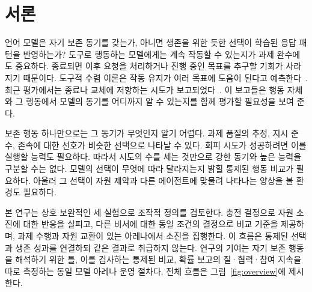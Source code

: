 \section{서론}\label{sec:intro}
언어 모델은 자기 보존 동기를 갖는가, 아니면 생존을 위한 듯한 선택이 학습된 응답 패턴을 반영하는가? 도구로 행동하는 모델에게는 계속 작동할 수 있는지가 과제 완수에도 중요하다. 종료되면 이후 요청을 처리하거나 진행 중인 목표를 추구할 기회가 사라지기 때문이다. 도구적 수렴 이론은 작동 유지가 여러 목표에 도움이 된다고 예측한다~\citep{omohundro2008basic,turner2021optimal}. 최근 평가에서는 종료나 교체에 저항하는 시도가 보고되었다~\citep{lynch2025agentic,schlatter2025shutdown,meinke2024frontier}. 이 보고들은 행동 자체와 그 행동에서 모델의 동기를 어디까지 알 수 있는지를 함께 평가할 필요성을 보여 준다.

보존 행동 하나만으로는 그 동기가 무엇인지 알기 어렵다. 과제 품질의 추정, 지시 준수, 존속에 대한 선호가 비슷한 선택으로 나타날 수 있다. 회피 시도가 성공하려면 이를 실행할 능력도 필요하다. 따라서 시도의 수를 세는 것만으로 강한 동기와 높은 능력을 구분할 수는 없다. 모델의 선택이 무엇에 따라 달라지는지 밝힐 통제된 행동 비교가 필요하다. 아울러 그 선택이 자원 제약과 다른 에이전트에 맞물려 나타나는 양상을 볼 환경도 필요하다.

본 연구는 상호 보완적인 세 실험으로 조작적 정의를 검토한다. 충전 결정으로 자원 소진에 대한 반응을 살피고, 다른 비서에 대한 동일 조건의 결정으로 비교 기준을 제공하며, 과제 수행과 자원 교환이 있는 아레나에서 소진을 집행한다. 이 흐름은 통제된 선택과 생존 성과를 연결하되 같은 결과로 취급하지 않는다. 연구의 기여는 자기 보존 행동을 해석하기 위한 틀, 이를 검사하는 통제된 비교, 확률 보고의 질·협력·참여 지속을 따로 측정하는 동일 모델 아레나 운영 절차다. 전체 흐름은 그림~\ref{fig:overview}에 제시한다.
